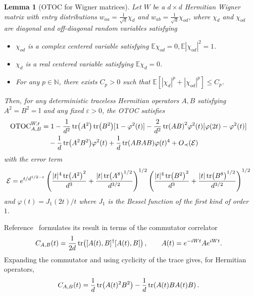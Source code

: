 \documentclass[onecolumn,prx,longbibliography,nofootinbib, superscriptaddress]{revtex4-2}
\newtheorem{lemma}{Lemma}
\theoremstyle{recap}
\begin{document}
\begin{lemma}[OTOC for Wigner matrices\cite{cipolloni2024outoftimeorderedcorrelatorswignermatrices}]
    Let $W$ be a $d\times d$ Hermitian Wigner matrix with entry distributions $w_{aa}=\frac{1}{\sqrt{d}}\chi_{d}$ and $w_{ab}=\frac{1}{\sqrt{d}}\chi_{od}$, where $\chi_d$ and $\chi_{od}$ are diagonal and off-diagonal random variables satisfying
    \begin{itemize}
        \item $\chi_{od}$ is a complex centered variable satisfying $\mathbb{E}\chi_{od}=0,\mathbb{E}|\chi_{od}|^2=1$.
        \item $\chi_{d}$ is a real centered variable satisfying $\mathbb{E}\chi_{d}=0$.
        \item For any $p\in\mathbb{N}$, there exists $C_{p}>0$ such that $\mathbb{E}[|\chi_{d}|^{p}+|\chi_{od}|^{p}]\leq C_{p}$.
    \end{itemize}
    Then, for any deterministic traceless Hermitian operators $A,B$ satisfying $A^2=B^2=\mathbb{I}$ and any fixed $\varepsilon>0$, the OTOC satisfies
    \begin{equation}\label{eq:Wigner_involution_OTOC}
    \begin{split}
        \mathrm{OTOC}_{A,B}^{W,t}&=1-\frac{1}{d^2}\tr(A^2)\tr(B^2)[1-\varphi^2(t)]-\frac{2}{d^2}\tr(AB)^2\varphi^2(t)[\varphi(2t)-\varphi^2(t)]\\
        &\quad-\frac{1}{d}\tr(A^2B^2)\varphi^2(t)+\frac{1}{d}\tr(ABAB)\varphi(t)^4+O_{\prec}(\mathcal{E})
    \end{split}
    \end{equation}
    with the error term
    \begin{equation}\label{eq:Wigner_involution_error}
        \mathcal{E}=e^{t/d^{1/2-\varepsilon}}\left(\frac{|t|^4\tr(A^2)^2}{d^3}+\frac{|t|\tr(A^{8})^{1/2}}{d^{3/2}}\right)^{1/2}\left(\frac{|t|^4\tr(B^2)^2}{d^3}+\frac{|t|\tr(B^{8})^{1/2}}{d^{3/2}}\right)^{1/2}
    \end{equation}
    and $\varphi(t)=J_1(2t)/t$ where $J_1$ is the Bessel function of the first kind of order $1$.
\end{lemma}
Reference~\cite{cipolloni2024outoftimeorderedcorrelatorswignermatrices} formulates its result in terms of the commutator correlator
\[
    C_{A,B}(t)=\frac{1}{2d}\tr\!\left([A(t),B]^{\dagger}[A(t),B]\right),\qquad A(t)=e^{-iWt}Ae^{iWt}.
\]
Expanding the commutator and using cyclicity of the trace gives, for Hermitian operators,
\[
    C_{A,B}(t)=\frac{1}{d}\tr\!\left(A(t)^2B^2\right)-\frac{1}{d}\tr\!\left(A(t)BA(t)B\right).
\]
\end{document}
